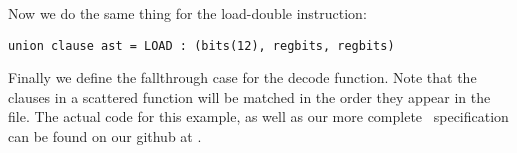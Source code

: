 \noindent Now we do the same thing for the load-double instruction:

\begin{lstlisting}
union clause ast = LOAD : (bits(12), regbits, regbits)
\end{lstlisting}

\sailfclLOADdecode
\sailfclLOADexecute

Finally we define the fallthrough case for the decode function. Note
that the clauses in a scattered function will be matched in the order
they appear in the file. The actual code for this example, as well as
our more complete \riscv\ specification can be found on our github at
.
